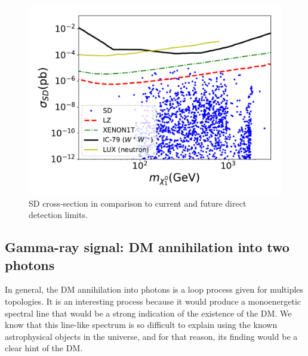 \documentclass[12pt,letterpaper]{article}
\begin{document}
\begin{figure}[h]
\begin{center}
\includegraphics[scale=0.5]{sigmaSD_with_neutrino_physics}
\caption{ SD cross-section  in comparison to current and future direct detection limits.  
}
\label{fig:SD-scan}
\end{center}
\end{figure}
%








\subsection{Gamma-ray signal: DM annihilation into two photons}
\label{sec:gamma-ray}
  
In general, the DM annihilation into photons is a loop process given for multiples topologies. 
It is an interesting process because it would produce a monoenergetic spectral line that would be a strong indication of the existence of the DM. We know that this line-like spectrum is so difficult to explain using the known astrophysical objects in the universe, and for that reason, its finding would be a clear hint of the DM.
     
\end{document}
